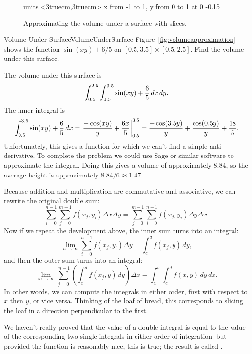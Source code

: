 \begin{figure}[H]
\centerline{
\vbox{\beginpicture
\normalgraphs
\setcoordinatesystem units <3truecm,3truecm>
\setplotarea x from -1 to 1, y from 0 to 1
 at 0 -0.15
\endpicture}}
\caption{Approximating the volume under a surface with slices.}
\label{fig:volumeapproximationwithslices}
\end{figure}

\begin{example}{Volume Under Surface}{VolumeUnderSurface}
Figure~\ref{fig:volumeapproximation} shows the function
$\sin(xy)+6/5$ on $[0.5,3.5]\times[0.5,2.5]$. Find the volume under this surface.
\end{example}
\begin{solution}
The volume under this surface is
\[\int_{0.5}^{2.5}\int_{0.5}^{3.5} \sin(xy)+{6\over5}\,dx\,dy.\]
The inner integral is
\[\int_{0.5}^{3.5} \sin(xy)+{6\over5}\,dx=
\left.{-\cos(xy)\over y}+{6x\over5}\right|_{0.5}^{3.5}=
{-\cos(3.5y)\over y}+{\cos(0.5y)\over y}+{18\over5}.\]
Unfortunately, this gives a function for which we can't find a simple
anti-derivative. To complete the problem we could use Sage or similar
software to approximate the integral. Doing this gives a volume of
approximately $8.84$, so the average height is approximately 
$8.84/6\approx 1.47$.
\end{solution}

Because addition and multiplication are commutative and associative,
we can rewrite the original double sum:
\[\sum_{i=0}^{n-1}\sum_{j=0}^{m-1}f(x_j,y_i)\Delta
  x\Delta y=\sum_{j=0}^{m-1}\sum_{i=0}^{n-1}f(x_j,y_i)\Delta
  y\Delta x.\]
Now if we repeat the development above, the inner sum turns into
an integral:
\[\lim_{n\to\infty}\sum_{i=0}^{n-1}f(x_j,y_i)\Delta
  y = \int_c^d f(x_j,y)\,dy,\]
and then the outer sum turns into an integral:
\[\lim_{m\to\infty}\sum_{j=0}^{m-1}\left(\int_c^d f(x_j,y)\,dy
\right)\Delta x = \int_a^b\int_c^d f(x,y)\,dy\,dx.\]
In other words, we can compute the integrals in either order, first
with respect to $x$ then $y$, or vice versa. Thinking of the loaf of
bread, this corresponds to slicing the loaf in a direction
perpendicular to the first. 

We haven't really proved that the value of a double integral is equal
to the value of the corresponding two single integrals in either order
of integration, but provided the function is reasonably nice, this is
true; the result is called .

